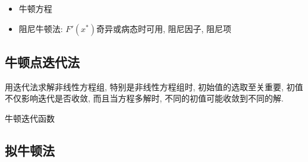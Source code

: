 \documentclass[twoside]{article}
\begin{document}
\begin{itemize}
  \item 牛顿方程
  \item 阻尼牛顿法: $F'(x^*)$奇异或病态时可用, 阻尼因子, 阻尼项
\end{itemize}

\subsection{牛顿点迭代法}
用迭代法求解非线性方程组, 特别是非线性方程组时, 初始值的选取至关重要, 初值不仅影响迭代是否收敛, 而且当方程多解时, 不同的初值可能收敛到不同的解.

牛顿迭代函数

\subsection{拟牛顿法}
\end{document}
